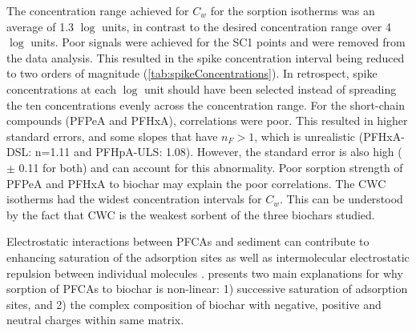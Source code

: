 The concentration range achieved for $C_w$ for the sorption isotherms was an average of 1.3 $\log$ units, in contrast to the desired concentration range over 4 $\log$ units. Poor signals were achieved for the SC1 points and were removed from the data analysis. This resulted in the spike concentration interval being reduced to two orders of magnitude (\cref{tab:spikeConcentrations}). In retrospect, spike concentrations at each $\log$ unit should have been selected instead of spreading the ten concentrations evenly across the concentration range. For the short-chain compounds (PFPeA and PFHxA), correlations were poor. This resulted in higher standard errors, and some slopes that have $n_F>1$, which is unrealistic (PFHxA-DSL: n=1.11 and PFHpA-ULS: 1.08). However, the standard error is also high ($\pm$ 0.11 for both) and can account for this abnormality. Poor sorption strength of PFPeA and PFHxA to biochar may explain the poor correlations. The CWC isotherms had the widest concentration intervals for $C_w$. This can be understood by the fact that CWC is the weakest sorbent of the three biochars studied.  

Electrostatic interactions between PFCAs and sediment can contribute to enhancing saturation of the adsorption sites as well as intermolecular electrostatic repulsion between individual molecules \citep{higgins2006sorption,yin2022insights}. \cite{yin2022insights} presents two main explanations for why sorption of PFCAs to biochar is non-linear: 1) successive saturation of adsorption sites, and 2) the complex composition of biochar with negative, positive and neutral charges within same matrix. 

